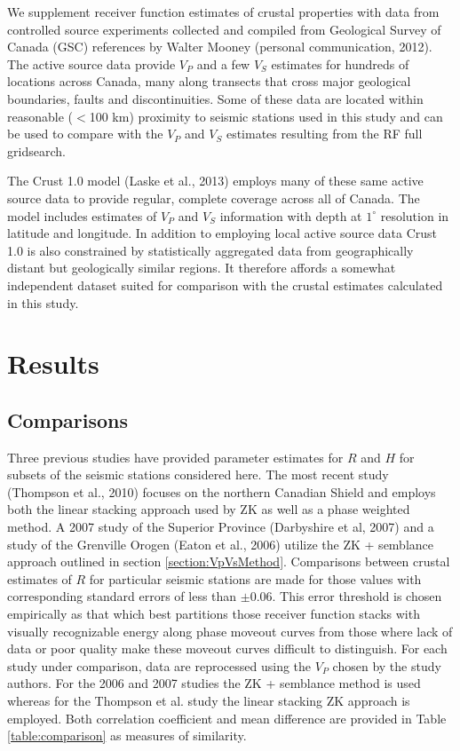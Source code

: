 \documentclass[msc,oneside]{ubcthesis}
\begin{document}
We supplement receiver function estimates of crustal properties with data from controlled source experiments collected and compiled from Geological Survey of Canada (GSC) references by Walter Mooney (personal communication, 2012). The active source data provide $V_P$ and a few $V_S$ estimates for hundreds of locations across Canada, many along transects that cross major geological boundaries, faults and discontinuities. Some of these data are located within reasonable ($<$100 km) proximity to seismic stations used in this study and can be used to compare with the $V_P$ and $V_S$ estimates resulting from the RF full gridsearch.

The Crust 1.0 model (Laske et al., 2013) employs many of these same active source data to provide regular, complete coverage across all of Canada. The model includes estimates of $V_P$ and $V_S$ information with depth at $1^\circ$ resolution in latitude and longitude. In addition to employing local active source data Crust 1.0 is also constrained by statistically aggregated data from geographically distant but geologically similar regions. It therefore affords a somewhat independent dataset suited for comparison with the crustal estimates calculated in this study.

\chapter{Results} \label{cha:results}

\section{Comparisons}

Three previous studies have provided parameter estimates for $R$ and $H$ for subsets of the seismic stations considered here. The most recent study (Thompson et al., 2010) focuses on the northern Canadian Shield and employs both the linear stacking approach used by ZK as well as a phase weighted method. A 2007 study of the Superior Province (Darbyshire et al, 2007) and a study of the Grenville Orogen (Eaton et al., 2006) utilize the ZK + semblance approach outlined in section \ref{section:VpVsMethod}.  Comparisons between crustal estimates of $R$ for particular seismic stations are made for those values with corresponding standard errors of less than $\pm$0.06. This error threshold is chosen empirically as that which best partitions those receiver function stacks with visually recognizable energy along phase moveout curves from those where lack of data or poor quality make these moveout curves difficult to distinguish. For each study under comparison, data are reprocessed using the $V_P$ chosen by the study authors. For the 2006 and 2007 studies the ZK + semblance method is used whereas for the Thompson et al. study the linear stacking ZK approach is employed. Both correlation coefficient and mean difference are provided in Table \ref{table:comparison} as measures of similarity.
\end{document}
